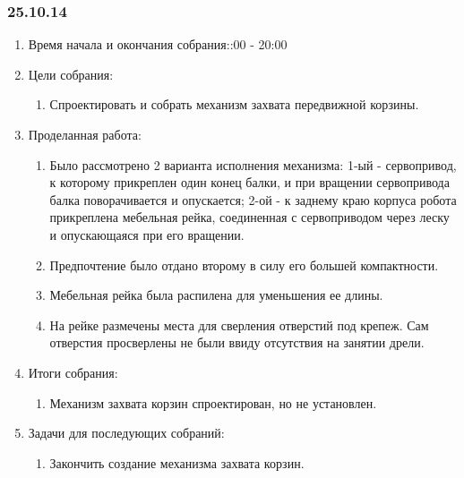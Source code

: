 
\subsubsection{25.10.14}

\begin{enumerate}
	\item Время начала и окончания собрания::00 - 20:00
	\item Цели собрания:\newline
	\begin{enumerate}
	  \item Спроектировать и собрать механизм захвата передвижной корзины.\newline
	  
    \end{enumerate}
    
	\item Проделанная работа:\newline
	\begin{enumerate}
	  \item Было рассмотрено 2 варианта исполнения механизма: 1-ый - сервопривод, к которому прикреплен один конец балки, и при вращении сервопривода балка поворачивается и опускается; 2-ой - к заднему краю корпуса робота прикреплена мебельная рейка, соединенная с сервоприводом через леску и опускающаяся при его вращении.\newline
      
      \item Предпочтение было отдано второму в силу его большей компактности.\newline
      
      \item Мебельная рейка была распилена для уменьшения ее длины.\newline
      
      \item На рейке размечены места для сверления отверстий под крепеж. Сам отверстия просверлены не были ввиду отсутствия на занятии дрели.\newline
      
    \end{enumerate}
    
	\item Итоги собрания: \newline
	\begin{enumerate}
	  \item Механизм захвата корзин спроектирован, но не установлен.\newline
      
    \end{enumerate}
    
	\item Задачи для последующих собраний:\newline
	\begin{enumerate}
	  \item Закончить создание механизма захвата корзин.\newline
	  
    \end{enumerate}     
\end{enumerate}

\fillpage

